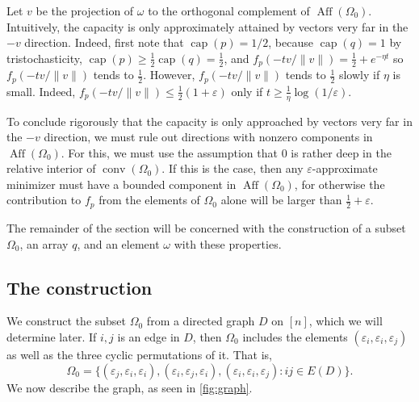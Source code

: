 \documentclass[10pt,a4paper]{article}
\numberwithin{equation}{section}
\DeclareMathOperator{\aff}{Aff}
\DeclareMathOperator{\conv}{conv}
\DeclareMathOperator{\capa}{cap}
\newcommand{\eps}{\varepsilon}
\begin{document}
Let $v$ be the projection of $\omega$ to the orthogonal complement of $\aff(\Omega_0)$. Intuitively, the capacity is only approximately attained by vectors very far in the $-v$ direction. Indeed, first note that $\capa(p) = 1/2$, because $\capa(q) = 1$ by tristochasticity, $\capa(p) \geq \frac{1}{2} \capa(q) = \frac{1}{2}$, and $f_p(- tv/\|v\|) = \frac{1}{2} + e^{ - \eta t}$ so $f_p(- tv/\|v\|)$ tends to $\frac 12$. However, $f_p( - t v/\|v\|)$ tends to $\frac 12$ slowly if $\eta$ is small. Indeed, $f_p( - t v/\|v\|) \leq \frac{1}{2}(1 + \eps)$ only if $t \geq \frac{1}{\eta} \log (1/\eps)$. 

To conclude rigorously that the capacity is only approached by vectors very far in the $-v$ direction, we must rule out directions with nonzero components in $\aff(\Omega_0)$. For this, we must use the assumption that $0$ is rather deep in the relative interior of $\conv(\Omega_0)$. If this is the case, then any $\eps$-approximate minimizer must have a bounded component in $\aff(\Omega_0)$, for otherwise the contribution to $f_p$ from the elements of $\Omega_0$ alone will be larger than $\frac{1}{2} + \eps$. 

The remainder of the section will be concerned with the construction of a subset $\Omega_0$, an array $q$, and  an element $\omega$ with these properties.


\subsection{The construction}\label{subsec:diameter-constr}

We construct the subset $\Omega_0$ from a directed graph $D$ on $[n]$, which we will determine later. If $i,j$ is an edge in $D$, then $\Omega_0$ includes the elements $(\eps_i, \eps_i, \eps_j)$ as well as the three cyclic permutations of it. That is, 
$$ \Omega_0 = \{(\eps_j, \eps_i, \eps_i), (\eps_i, \eps_j, \eps_i), (\eps_i, \eps_i, \eps_j): ij \in E(D)\}.$$
We now describe the graph, as seen in \cref{fig:graph}.
\end{document}
